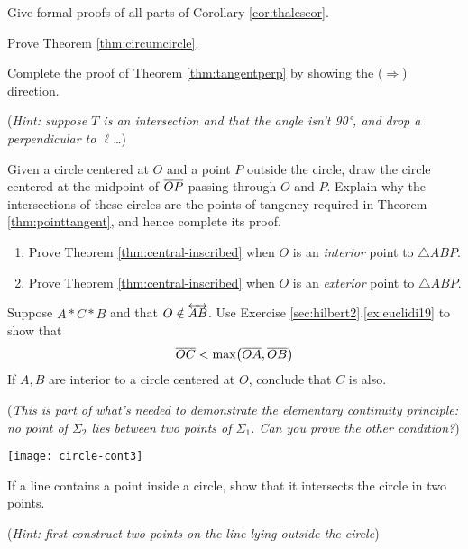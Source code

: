 \begin{exercises}
	\exstart Give formal proofs of all parts of Corollary \ref{cor:thalescor}.
	\begin{enumerate}\setcounter{enumi}{1} 
	  \item Prove Theorem \ref{thm:circumcircle}.
	  
	  \item Complete the proof of Theorem \ref{thm:tangentperp} by showing the ($\Rightarrow$) direction.\par
	  (\emph{Hint: suppose $T$ is an intersection and that the angle isn't \ang{90}, and drop a perpendicular to $\ell$\ldots})
	  
	  \item\label{ex:pointtangent} Given a circle centered at $O$ and a point $P$ outside the circle, draw the circle centered at the midpoint of $\overline{OP}$ passing through $O$ and $P$. Explain why the intersections of these circles are the points of tangency required in Theorem \ref{thm:pointtangent}, and hence complete its proof.
	  
	  \item\begin{enumerate}
	    \item Prove Theorem \ref{thm:central-inscribed} when $O$ is an \emph{interior} point to $\triangle ABP$.
	    \item Prove Theorem \ref{thm:central-inscribed} when $O$ is an \emph{exterior} point to $\triangle ABP$.
	  \end{enumerate}
	  
	  
	  \begin{minipage}[t]{0.79\linewidth}\vspace{0pt}
	  	\item\label{exs:elemcont} Suppose $A*C*B$ and that $O\notin\overleftrightarrow{AB}$. Use Exercise \ref*{sec:hilbert2}.\ref{ex:euclidi19} to show that
	  	\[
	  		\overline{OC}< \max\bigl(\overline{OA},\overline{OB}\bigr)
	  	\]
	  	If $A,B$ are interior to a circle centered at $O$, conclude that $C$ is also.\par
	 		(\emph{This is part of what's needed to demonstrate the elementary continuity principle: no point of $\Sigma_2$ lies between two points of $\Sigma_1$. Can you prove the other condition?})
	  \end{minipage}
	  \hfill
	  \begin{minipage}[t]{0.2\linewidth}\vspace{0pt}
	  	\flushright
	  	\texttt{[image: circle-cont3]}
	  \end{minipage}
	  
	  
	  \item\label{ex:linecircle2} If a line contains a point inside a circle, show that it intersects the circle in two points.\par
	  (\emph{Hint: first construct two points on the line lying outside the circle})
	\end{enumerate}
\end{exercises}




